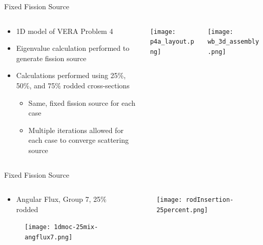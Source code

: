 
\begin{frame}[t]{Fixed Fission Source}
    
    \begin{columns}
        \begin{column}{0.5\textwidth}
    \begin{itemize}
      \item 1D model of VERA Problem 4
      \item Eigenvalue calculation performed to generate fission source
      \item Calculations performed using 25\%, 50\%, and 75\% rodded 
      cross-sections
      \begin{itemize}
        \item Same, fixed fission source for each case
        \item Multiple iterations allowed for each case to converge scattering 
        source
      \end{itemize}
    \end{itemize}
\end{column}
\begin{column}{0.28\textwidth}
\texttt{[image: p4a\_layout.png]}
\end{column}
\begin{column}{0.22\textwidth}
\texttt{[image: wb\_3d\_assembly.png]}
\end{column}
\end{columns}
    
\end{frame}


\begin{frame}[t]{Fixed Fission Source}

\begin{columns}
    \begin{column}{0.6\textwidth}
\begin{itemize}
  \item Angular Flux, Group 7, 25\% rodded
\end{itemize}
\begin{figure}[H]
    \centering
    \texttt{[image: 1dmoc-25mix-angflux7.png]}
\end{figure}
\end{column}
\begin{column}{0.4\textwidth}
\begin{figure}[H]
    \centering
    \texttt{[image: rodInsertion-25percent.png]}
\end{figure}
\end{column}
\end{columns}

\end{frame}

